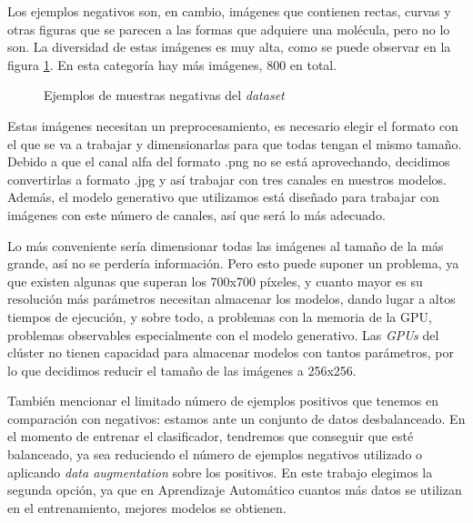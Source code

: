Los ejemplos negativos son, en cambio, imágenes que contienen rectas, curvas y otras figuras que se parecen a las formas que adquiere una molécula, pero no lo son. La diversidad de estas imágenes es muy alta, como se puede observar en la figura \ref{fig:negative_examples}. En esta categoría hay más imágenes, 800 en total.

\begin{figure}[H]
\centering
    \caption{Ejemplos de muestras negativas del \textit{dataset}}
    \label{fig:negative_examples}
\end{figure}

Estas imágenes necesitan un preprocesamiento, es necesario elegir el formato con el que se va a trabajar y dimensionarlas para que todas tengan el mismo tamaño. Debido a que el canal alfa del formato .png no se está aprovechando, decidimos convertirlas a formato .jpg y así trabajar con tres canales en nuestros modelos. Además, el modelo generativo que utilizamos está diseñado para trabajar con imágenes con este número de canales, así que será lo más adecuado.

Lo más conveniente sería dimensionar todas las imágenes al tamaño de la más grande, así no se perdería información. Pero esto puede suponer un problema, ya que existen algunas que superan los 700x700 píxeles, y cuanto mayor es su resolución más parámetros necesitan almacenar los modelos, dando lugar a altos tiempos de ejecución, y sobre todo, a problemas con la memoria de la GPU, problemas observables especialmente con el modelo generativo. Las \textit{GPUs} del clúster no tienen capacidad para almacenar modelos con tantos parámetros, por lo que decidimos reducir el tamaño de las imágenes a 256x256. 

También mencionar el limitado número de ejemplos positivos que tenemos en comparación con negativos: estamos ante un conjunto de datos desbalanceado. En el momento de entrenar el clasificador, tendremos que conseguir que esté balanceado, ya sea reduciendo el número de ejemplos negativos utilizado o aplicando \textit{data augmentation} sobre los positivos. En este trabajo elegimos la segunda opción, ya que en Aprendizaje Automático cuantos más datos se utilizan en el entrenamiento, mejores modelos se obtienen. 

